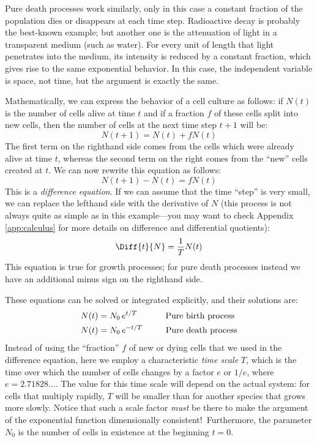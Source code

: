 Pure death processes  work similarly, only in this case a constant
fraction of the population dies or disappears at each time step.
Radioactive decay is probably the best-known example; but another one
is the attenuation of light in a transparent medium (such as water).
For every unit of length that light penetrates into the medium, its
intensity is reduced by a constant fraction, which gives rise to the
same exponential behavior. In this case, the independent variable is
space, not time, but the argument is exactly the same.

Mathematically, we can express the behavior of a cell culture as
follows: if $N(t)$ is the number of cells alive at time $t$ and if
a fraction $f$ of these\vadjust{\pagebreak} cells split into new cells, then the number
of cells at the next time step $t+1$ will be:
%
\[
N(t+1) = N(t) + f N(t)
\]
%
The first term on the righthand side comes from the cells
which were already alive at time $t$, whereas the second term on
the right comes from the ``new'' cells created at $t$. We can now
rewrite this equation as follows:
%
\[
N(t+1) - N(t) = f N(t)
\]
%
This is a \emph{difference equation}. If we can assume that the time
``step'' is very small, we can replace the lefthand side with the
derivative of $N$ (this process is not always quite as simple as in
this example---you may want to check Appendix \ref{app:calculus} for
more details on difference and differential quotients): 
%
\[
\Diff{t}{N} = \frac{1}{T} N(t)
\]
\noindent This equation is true for growth processes; for pure death processes
instead we have an additional minus sign on the righthand side. 

These equations can be solved or integrated explicitly, and their
solutions are:
\begin{align*}
N(t) & = N_0 \, e^{t/T} \qquad & \text{Pure birth process\hskip3pt} \\
N(t) & = N_0 \, e^{-t/T}       & \text{ Pure death process} 
\end{align*}
Instead of using the ``fraction'' $f$ of new or dying cells that we
used in the difference equation, here we employ a characteristic
\emph{time scale} $T$, which is the time over which the number of
cells changes by a factor $e$ or $1/e$, where $e=2.71828\dots$.  The
value for this time scale will depend on the actual system: for cells
that multiply rapidly, $T$ will be smaller than for another species
that grows more slowly.  Notice that such a scale factor \emph{must}
be there to make the argument of the exponential function
dimensionally consistent!~Furthermore, the parameter $N_0$ is the
number of cells in existence at the beginning $t=0$.

